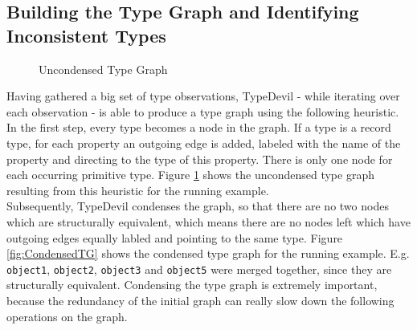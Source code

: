 \documentclass[runningheads,a4paper]{llncs}
\begin{document}
\subsection{Building the Type Graph and Identifying Inconsistent Types}
\label{TGs}
\begin{figure}[h]
    \caption{Uncondensed Type Graph}
    \label{fig:UncondensedTG}
    \end{figure}
Having gathered a big set of type observations, TypeDevil - while iterating over each observation - is able to produce a type graph using the following heuristic.
In the first step, every type becomes a node in the graph.
If a type is a record type, for each property an outgoing edge is added, labeled with the name of the property and directing to the type of this property. 
There is only one node for each occurring primitive type.
Figure \ref{fig:UncondensedTG} shows the uncondensed type graph resulting from this heuristic for the running example.\\
Subsequently, TypeDevil condenses the graph, so that there are no two nodes which are structurally equivalent, which means there are no nodes left which have outgoing edges equally labled and pointing to the same type.
Figure \ref{fig:CondensedTG} shows the condensed type graph for the running example.
E.g. \lstinline[columns=fixed]{object1}, \lstinline[columns=fixed]{object2}, \lstinline[columns=fixed]{object3} and \lstinline[columns=fixed]{object5} were merged together, since they are structurally equivalent.
Condensing the type graph is extremely important, because the redundancy of the initial graph can really slow down the following operations on the graph.
\end{document}
